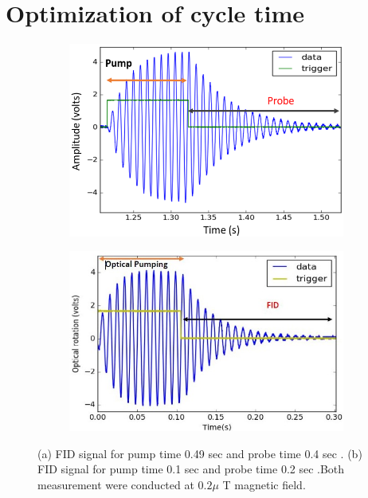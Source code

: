 \documentclass[12pt]{report}
\begin{document}
   \section{Optimization of cycle time} 
   \begin{figure}
    \centering
 
    \begin{subfigure}[b]{0.425\textwidth}
        \centering
        \includegraphics[width=\textwidth]{figures/Capture}
        \caption{}
        \label{fig:three sin x}
    \end{subfigure}
    \hfill
    \begin{subfigure}[b]{0.42\textwidth}
        \centering
        \includegraphics[width=\textwidth]{figures/Capture2}
        \caption{}
        \label{fig:five over x}
    \end{subfigure}
    \caption{(a) FID signal for pump time 0.49 sec and probe time 0.4 sec . (b) FID signal for pump time 0.1 sec and probe time 0.2 sec .Both measurement were conducted at $0.2 \mu$ T magnetic field.}
    \label{fig:three graphs}
\end{figure} 
\end{document}
